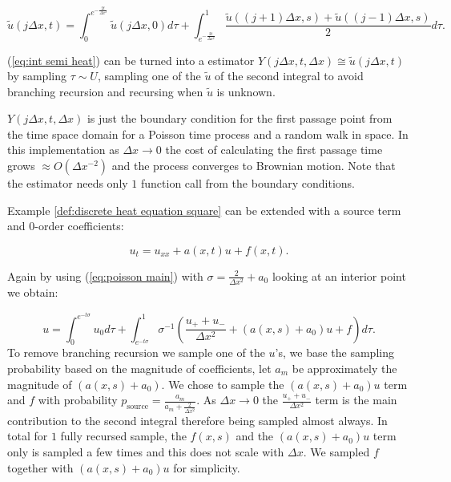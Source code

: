 \documentclass[a4paper,12pt]{article}
\begin{document}
\begin{equation}
  \tilde{u}(j \Delta x,t) = \int_{0}^{e^{-\frac{2t}{\Delta x^{2}}}}  \tilde{u}(j \Delta x,0) d\tau+
  \int_{e^{-\frac{2t}{\Delta x^{2}}}}^{1} \frac{\tilde{u}((j+1) \Delta x,s)+\tilde{u}((j-1) \Delta x,s)}{2}d\tau. \label{eq:int semi heat}
\end{equation}

\begin{julia}\label{jl:point estimator heat}

  (\ref{eq:int semi heat}) can be turned into a estimator $Y(j \Delta x,t,\Delta x ) \cong  \tilde{u}(j \Delta x,t)$
  by sampling $\tau \sim U$,
  sampling one of the $\tilde{u}$ of the second integral to avoid branching recursion and
  recursing when $\tilde{u}$ is unknown.


  $Y(j \Delta x,t,\Delta x )$ is just the boundary condition
  for the first passage point from the time space domain for a Poisson time process and a random walk in space.
  In this implementation as  $\Delta x \rightarrow 0$  the cost of calculating the first passage time grows
  $\approx O(\Delta x ^{-2})$ and the process converges to Brownian motion. Note that the estimator needs
  only $1$ function call from the boundary conditions.
\end{julia}

\begin{example} \label{ex:semi heat source}

  Example \ref{def:discrete heat equation square}
  can be extended with a source term and $0$-order coefficients:

  \begin{equation}
    u_{t} = u_{xx} + a(x,t)u + f(x,t)
    .
  \end{equation}

  Again by using (\ref{eq:poisson main}) with $\sigma = \frac{2}{\Delta x^{2}} +a_{0}$
  looking at an interior point we obtain:

  \begin{equation}
    u =
    \int_{0}^{e^{-t \sigma }} u_{0} d\tau  + \int_{e^{-t \sigma }}^{1}
    \sigma^{-1}
    \left(
    \frac{u_{+} + u_{-}}{\Delta x^{2}} +(a(x,s)+ a_{0}) u+ f
    \right)
    d\tau
    .
  \end{equation}
  To remove branching recursion we sample one of the $u$'s, we base the sampling
  probability based on the magnitude of coefficients, let $a_m$ be approximately the magnitude of
  $(a(x,s)+ a_{0})$. We chose to sample the $(a(x,s)+ a_{0})u$ term and $f$
  with probability $p_{\text{source}} = \frac{a_m}{a_m + \frac{2}{\Delta x^{2}}}$.
  As $\Delta x \rightarrow 0$ the $\frac{u_{+} + u_{-}}{\Delta x^{2}}$ term is
  the main contribution to the second integral therefore
  being sampled almost always.
  In total for $1$ fully recursed sample,
  the $f(x,s)$ and the $(a(x,s)+ a_{0})u$ term only
  is sampled a few times and this does not scale with $\Delta x$. We
  sampled $f$ together with $(a(x,s)+ a_{0})u$ for simplicity.
\end{example}
\end{document}
